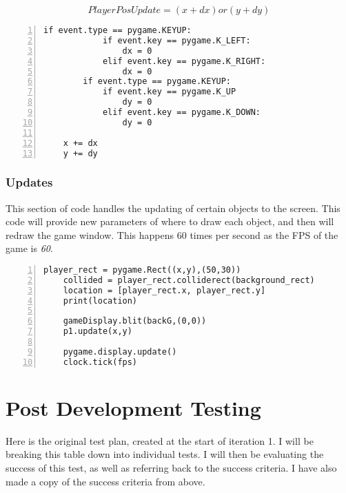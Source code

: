 \documentclass[12pt]{report}
\begin{document}
\begin{equation}
        Player Pos Update = (x + dx) or (y + dy)
\end{equation}

\begin{Verbatim}[numbers=left, frame=single]
        if event.type == pygame.KEYUP:
            if event.key == pygame.K_LEFT:
                dx = 0
            elif event.key == pygame.K_RIGHT:
                dx = 0
        if event.type == pygame.KEYUP:
            if event.key == pygame.K_UP
                dy = 0
            elif event.key == pygame.K_DOWN:
                dy = 0
                
    x += dx
    y += dy
\end{Verbatim}

\subsubsection{Updates}
This section of code handles the updating of certain objects to the screen. This code will provide new parameters of where to draw each object, and then will redraw the game window. This happens 60 times per second as the FPS of the game is \textit{60}.

\begin{Verbatim}[numbers=left, frame=single]
    player_rect = pygame.Rect((x,y),(50,30))
    collided = player_rect.colliderect(background_rect)
    location = [player_rect.x, player_rect.y]
    print(location)
    
    gameDisplay.blit(backG,(0,0))
    p1.update(x,y)
    
    pygame.display.update()
    clock.tick(fps)
\end{Verbatim}

\pagebreak

\section{Post Development Testing}
Here is the original test plan, created at the start of iteration 1. I will be breaking this table down into individual tests. I will then be evaluating the success of this test, as well as referring back to the success criteria. I have also made a copy of the success criteria from above.
\end{document}
